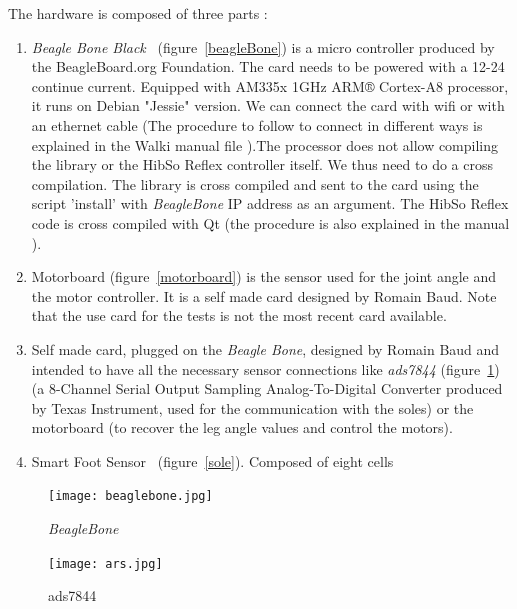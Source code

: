 \documentclass[a4paper,12pt]{article}
\begin{document}
The hardware is composed of three parts :
\begin{enumerate}
  \item \textit{Beagle Bone Black}~\cite{beagleboneblack} (figure~\ref{beagleBone}) is a micro controller produced by the BeagleBoard.org Foundation. The card needs to be powered with a 12-24 continue current. Equipped with AM335x 1GHz ARM® Cortex-A8 processor, it runs on Debian "Jessie" version. We can connect the card with wifi or with an ethernet cable (The procedure to follow to connect in different ways is explained in the Walki manual file \cite{walkisoftwarepack}).The processor does not allow compiling the library or the HibSo Reflex controller itself. We thus need to do a cross compilation. The library is cross compiled and sent to the card using the script 'install' with \textit{BeagleBone} IP address as an argument. The HibSo Reflex code is cross compiled with Qt (the procedure is also explained in the manual \cite{walkisoftwarepack}).
  \item Motorboard (figure~\ref{motorboard}) is the sensor used for the joint angle and the motor controller. It is a self made card designed by Romain Baud. Note that the use card for the tests is not the most recent card available.
  \item Self made card, plugged on the \textit{Beagle Bone}, designed by Romain Baud and intended to have all the necessary sensor connections like \textit{ads7844} (figure~\ref{ads7844}) (a 8-Channel Serial Output Sampling Analog-To-Digital Converter produced by Texas Instrument, used for the communication with the soles) or the motorboard (to recover the leg angle values and control the motors). 
  \item Smart Foot Sensor~\cite{soles} (figure~\ref{sole}). Composed of eight cells 
\end{enumerate}

\begin{figure}[H]
\begin{minipage}[c]{.46\linewidth}
     \begin{center}
             \texttt{[image: beaglebone.jpg]}
             \caption{\textit{BeagleBone}}
             \label{beagleBone}
         \end{center}
   \end{minipage} \hfill
   \begin{minipage}[c]{.46\linewidth}
    \begin{center}
            \texttt{[image: ars.jpg]}
            \caption{ads7844}
            \label{ads7844}
        \end{center}
 \end{minipage}
\end{figure}
\end{document}
